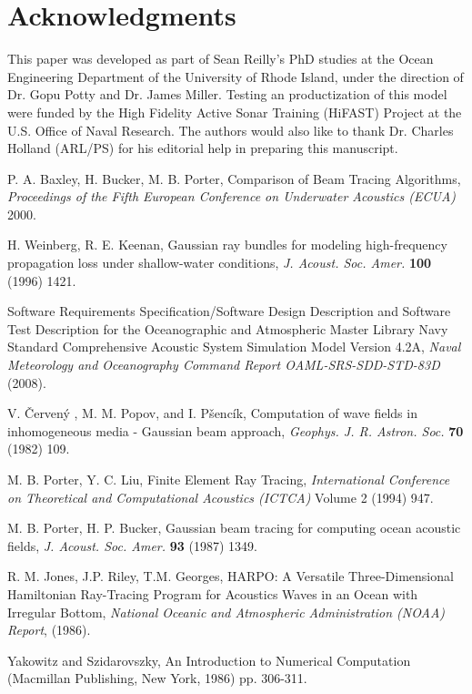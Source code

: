 \documentclass{ws-jca}
\newcommand{\Cerveny}{\v{C}erven\'{y} }
\begin{document}
\section*{Acknowledgments}

This paper was developed as part of Sean Reilly's PhD studies at the Ocean
Engineering Department of the University of Rhode Island, under the
direction of Dr. Gopu Potty and Dr. James Miller. Testing an productization
of this model were funded by the High Fidelity Active Sonar Training
(HiFAST) Project at the U.S. Office of Naval Research. 
The authors would also like to thank Dr. Charles Holland
(ARL/PS) for his editorial help in preparing this manuscript.

\begin{thebibliography}{0}
 P. A. Baxley, H. Bucker, M. B. Porter, Comparison of
Beam Tracing Algorithms, {\it Proceedings of the Fifth European Conference
on Underwater Acoustics (ECUA)} {2000}.

 H. Weinberg, R. E. Keenan, Gaussian ray bundles for
modeling high-frequency propagation loss under shallow-water conditions,
{\it J. Acoust. Soc. Amer.} {\bf 100} (1996) 1421.

 Software Requirements Specification/Software Design
Description and Software Test Description for the Oceanographic and
Atmospheric Master Library Navy Standard Comprehensive Acoustic System
Simulation Model Version 4.2A, {\it Naval Meteorology and Oceanography
Command Report OAML-SRS-SDD-STD-83D} (2008).

 V. \Cerveny, M. M. Popov, and I. P\v{s}enc\'{i}k, Computation
of wave fields in inhomogeneous media - Gaussian beam approach, {\it
Geophys. J. R. Astron. Soc.} {\bf 70} (1982) 109.

 M. B. Porter, Y. C. Liu, Finite Element Ray Tracing, 
{\it International Conference on Theoretical and Computational Acoustics (ICTCA)} Volume 2 (1994) 947.

 M. B. Porter, H. P. Bucker, Gaussian beam tracing for
computing ocean acoustic fields, {\it J. Acoust. Soc. Amer.} {\bf 93}
(1987) 1349.

 R. M. Jones, J.P. Riley, T.M. Georges, HARPO: A
Versatile Three-Dimensional Hamiltonian Ray-Tracing Program for Acoustics
Waves in an Ocean with Irregular Bottom, {\it National Oceanic and
Atmospheric Administration (NOAA) Report}, (1986).

 Yakowitz and Szidarovszky, An Introduction to
Numerical Computation (Macmillan Publishing, New York, 1986) pp. 306-311.


\end{thebibliography}
\end{document}
